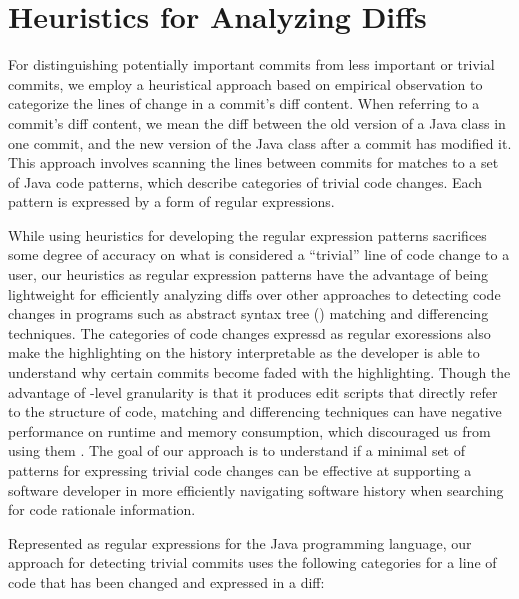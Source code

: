 \section{Heuristics for Analyzing Diffs}
\label{sec:Heuristics}

For distinguishing potentially important commits from less important or trivial commits, we employ a heuristical approach based on empirical observation to categorize the lines of change in a commit's diff content.
When referring to a commit's diff content, we mean the diff between the old version of a Java class in one commit, and the new version of the Java class after a commit has modified it.
This approach involves scanning the lines between commits for matches to a set of Java code patterns, which describe categories of trivial code changes.
Each pattern is expressed by a form of regular expressions.

While using heuristics for developing the regular expression patterns sacrifices some degree of accuracy on what is considered a ``trivial'' line of code change to a user,
our heuristics as regular expression patterns have the advantage of being lightweight for efficiently analyzing diffs over other approaches to detecting code changes in programs such as abstract syntax tree () matching and differencing techniques.
The categories of code changes expressd as regular exoressions also  make the highlighting on the history interpretable as the developer is able to understand why certain commits become faded with the highlighting.
Though the advantage of -level granularity is that it produces edit scripts that directly refer to the structure of code,  matching and differencing techniques can have negative performance on runtime and memory consumption, which discouraged us from using them \cite{fluri_change_2007,pawlik_RTED_2011,falleri_fine-grained_2014}.
The goal of our approach is to understand if a minimal set of patterns for expressing trivial code changes can be effective at supporting a software developer in more efficiently navigating software history when searching for code rationale information.

Represented as regular expressions for the Java programming language, our approach for detecting trivial commits uses the following categories for a line of code that has been changed and expressed in a diff: 

